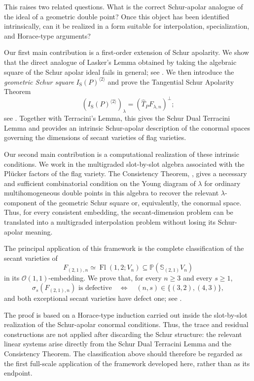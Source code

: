 \documentclass[a4paper,reqno]{amsart}
\theoremstyle{plainnopunct}
\theoremstyle{definitionnopunct}
\renewcommand{\P}{\mathbb{P}}
\renewcommand{\S}{\mathbb{S}}
\newcommand{\cO}{\mathcal{O}}
\newcommand{\SchurDouble}[1]{I_{\mathrm S}(#1)^{\langle 2\rangle}}
\DeclareMathOperator{\Fl}{Fl}
\begin{document}
This raises two related questions. What is the correct Schur-apolar
analogue of the ideal of a geometric double point? Once this object
has been identified intrinsically, can it be realized in a form
suitable for interpolation, specialization, and Horace-type
arguments?

Our first main contribution is a first-order extension of Schur
apolarity. We show that the direct analogue of Lasker's Lemma obtained
by taking the algebraic square of the Schur apolar ideal fails in
general; see . We then
introduce the \emph{geometric Schur square} $\SchurDouble{P}$ and
prove the Tangential Schur Apolarity Theorem
\[
\left(
\SchurDouble{P}
\right)_\lambda
=
\left(
\widehat T_PF_{\lambda,n}
\right)^\perp;
\]
see . Together with
Terracini's Lemma, this gives the Schur Dual Terracini Lemma and
provides an intrinsic Schur-apolar description of the conormal spaces
governing the dimensions of secant varieties of flag varieties.

Our second main contribution is a computational realization of these
intrinsic conditions. We work in the multigraded slot-by-slot algebra
associated with the Pl\"ucker factors of the flag variety. The Consistency Theorem, , gives a necessary
and sufficient combinatorial condition on the Young diagram of
$\lambda$ for ordinary multihomogeneous double points in this algebra
to recover the relevant $\lambda$-component of the geometric Schur
square or, equivalently, the conormal space. Thus, for every consistent
embedding, the secant-dimension problem can be translated into a
multigraded interpolation problem without losing its Schur-apolar
meaning.

The principal application of this framework is the complete
classification of the secant varieties of
\[
F_{(2,1),n}
\simeq
\Fl(1,2;V_n)
\subseteq
\P(\S_{(2,1)}V_n)
\]
in its $\cO(1,1)$-embedding. We prove that, for every $n\geq3$ and
every $s\geq1$,
\[
\sigma_s(F_{(2,1),n})
\text{ is defective}
\quad\Longleftrightarrow\quad
(n,s)\in\{(3,2),(4,3)\},
\]
and both exceptional secant varieties have defect one; see
.

The proof is based on a Horace-type induction carried out inside the
slot-by-slot realization of the Schur-apolar conormal conditions.
Thus, the trace and residual constructions are not applied after
discarding the Schur structure: the relevant linear systems arise
directly from the Schur Dual Terracini Lemma and the Consistency Theorem. The
classification above should therefore be regarded as the first
full-scale application of the framework developed here, rather than
as its endpoint.
\end{document}
